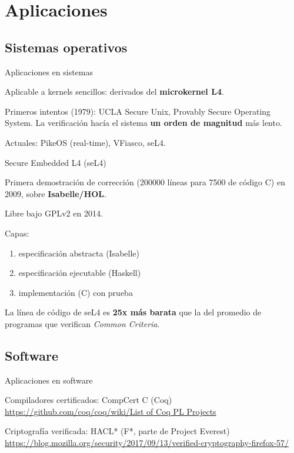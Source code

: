 \section{Aplicaciones}

\subsection{Sistemas operativos}

\begin{frame}{Aplicaciones en sistemas}

Aplicable a kernels sencillos: derivados del \textbf{microkernel L4}.

Primeros intentos (1979): UCLA Secure Unix, Provably Secure Operating System. La verificación hacía el sistema \textbf{un orden de magnitud} más lento.

Actuales: PikeOS (real-time), VFiasco, seL4.

\end{frame}

\begin{frame}{Secure Embedded L4 (seL4)}

Primera demostración de corrección (200000 líneas para 7500 de código C) en 2009, sobre \textbf{Isabelle/HOL}.

Libre bajo GPLv2 en 2014.

Capas:
\begin{enumerate}
\item especificación abstracta (Isabelle)
\item especificación ejecutable (Haskell)
\item implementación (C) con prueba
\end{enumerate}

La línea de código de seL4 es \textbf{25x más barata} que la del promedio de programas que verifican \textit{Common Criteria}.

\end{frame}



\subsection{Software}

\begin{frame}{Aplicaciones en software}

Compiladores certificados: CompCert C (Coq)
{\scriptsize\url{https://github.com/coq/coq/wiki/List of Coq PL Projects}}

Criptografía verificada: HACL* (F*, parte de Project Everest)
{\scriptsize\url{https://blog.mozilla.org/security/2017/09/13/verified-cryptography-firefox-57/}}
\end{frame}

